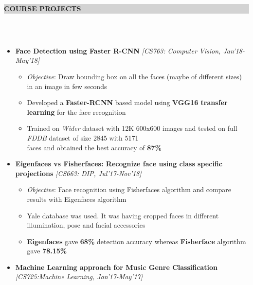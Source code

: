 \documentclass[a4paper,10pt]{article}
\newcommand{\lsep}{-0.5cm}
\newcommand{\hsep}{-0.6cm}
\newcommand{\resheading}[1]{{\small \colorbox{lightgray}{\begin{minipage}{1\textwidth}{\textbf{#1 \vphantom{p\^{E}}}}\end{minipage}}}}
\begin{document}
\hspace{-0.5cm}
\resheading{\textbf{\large COURSE PROJECTS}}\\[\lsep]
\\[-0.4cm]
\begin{itemize}
    
    \item \textbf{Face Detection using Faster R-CNN}  \hfill\emph{ [CS763: Computer Vision, Jan'18-May'18]}\\[\hsep]
        \begin{itemize}
	      \item \textit{Objective}: Draw bounding box on all the faces (maybe of different sizes) in an image in few seconds \\[-0.55cm] 
	        \item Developed a \textbf{Faster-RCNN} based model using \textbf{VGG16 transfer learning} for the face recognition \\[-0.55cm] 
	        \item Trained on \textit{Wider} dataset with 12K 600x600 images and tested on full \textit{FDDB} dataset of size 2845 with 5171\\[-0.05cm] faces and obtained the best accuracy of \textbf{87\%} \\[-0.55cm]
        \end{itemize}
    
    \item \textbf{Eigenfaces vs Fisherfaces: Recognize face using class specific projections}  \hfill\emph{[CS663: DIP, Jul'17-Nov'18]} \\ [\hsep]
     
        \begin{itemize}
            \item \textit{Objective}: Face recognition using Fisherfaces algorithm and compare results with Eigenfaces algorithm \\[-0.55cm]
	        \item  Yale database was used. It was having cropped faces in different illumination, pose and facial accessories \\[-0.55cm]
	        \item \textbf{Eigenfaces} gave \textbf{68\%} detection accuracy whereas \textbf{Fisherface} algorithm gave \textbf{78.15\%} \\[-0.55cm]
        \end{itemize}
        
    \item \textbf{Machine Learning approach for Music Genre Classification}  \hfill\emph{[CS725:Machine Learning, Jan'17-May'17]} \\[\hsep]
    

\end{itemize}
\end{document}
